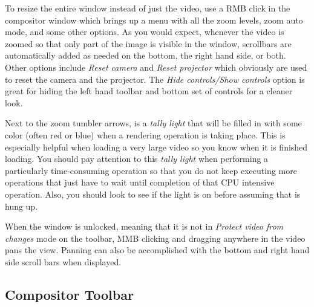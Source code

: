 To resize the entire window instead of just the video, use a RMB click in the compositor
window which brings up a menu with all the zoom levels, zoom auto mode, and some other options. 
As you would expect, whenever the video is zoomed so that only part of the image is visible
in the window, scrollbars are automatically added as needed on the bottom, the right hand 
side, or both.
Other options include \emph{Reset camera} and \emph{Reset projector} which obviously are used
to reset the camera and the projector. 
The \emph{Hide controls/Show controls} option is great for hiding the left hand toolbar and
bottom set of controls for a cleaner look. 

Next to the zoom tumbler arrows, is a \textit{tally light} that will be filled in with some color
(often red or blue) when a rendering operation
is taking place. This is especially helpful when loading a very large video so you know
when it is finished loading.  You should pay attention to this \textit{tally light} when performing
a particularly time-consuming operation so that you do not keep executing more operations
that just have to wait until completion of that CPU intensive operation.  Also, you should look
to see if the light is on before assuming that \CGG{} is hung up.

When the window is unlocked, meaning that it is not in \textit{Protect video from changes} mode on the
toolbar, MMB clicking and dragging anywhere in the video pans the view.  Panning can also
be accomplished with the bottom and right hand side scroll bars when displayed.

\subsection{Compositor Toolbar}%
\label{sub:compositor_toolbar}

